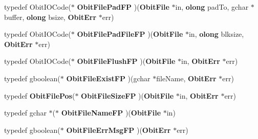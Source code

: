 \begin{CompactItemize}
\item 
typedef Obit\-IOCode($\ast$ {\bf Obit\-File\-Pad\-FP} )({\bf Obit\-File} $\ast$in, {\bf olong} pad\-To, gchar $\ast$buffer, {\bf olong} bsize, {\bf Obit\-Err} $\ast$err)
\item 
typedef Obit\-IOCode($\ast$ {\bf Obit\-File\-Pad\-File\-FP} )({\bf Obit\-File} $\ast$in, {\bf olong} blksize, {\bf Obit\-Err} $\ast$err)
\item 
typedef Obit\-IOCode($\ast$ {\bf Obit\-File\-Flush\-FP} )({\bf Obit\-File} $\ast$in, {\bf Obit\-Err} $\ast$err)
\item 
typedef gboolean($\ast$ {\bf Obit\-File\-Exist\-FP} )(gchar $\ast$file\-Name, {\bf Obit\-Err} $\ast$err)
\item 
typedef {\bf Obit\-File\-Pos}($\ast$ {\bf Obit\-File\-Size\-FP} )({\bf Obit\-File} $\ast$in, {\bf Obit\-Err} $\ast$err)
\item 
typedef gchar $\ast$($\ast$ {\bf Obit\-File\-Name\-FP} )({\bf Obit\-File} $\ast$in)
\item 
typedef gboolean($\ast$ {\bf Obit\-File\-Err\-Msg\-FP} )({\bf Obit\-Err} $\ast$err)
\end{CompactItemize}
